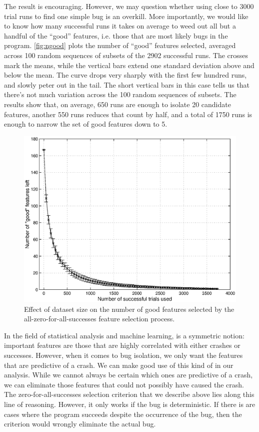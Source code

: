 The result is encouraging.  However, we may question whether using
close to 3000 trial runs to find one simple bug is an overkill.  More
importantly, we would like to know how many successful runs it takes
on average to weed out all but a handful of the ``good'' features,
i.e. those that are most likely bugs in the program.
\autoref{fig:ngood} plots the number of ``good'' features selected,
averaged across 100 random sequences of subsets of the 2902 successful
runs.  The crosses mark the means, while the vertical bars extend one
standard deviation above and below the mean.  The curve drops very
sharply with the first few hundred runs, and slowly peter out in the
tail.  The short vertical bars in this case tells us that there's not
much variation across the 100 random sequences of subsets.  The
results show that, on average, 650 runs are enough to isolate 20
candidate features, another 550 runs reduces that count by half, and
a total of 1750 runs is enough to narrow the set of good features down
to 5.

\begin{figure}
  \centering
  \small
  \includegraphics[width=\columnwidth]{applications/ds1000ngood_plot}
  \caption{Effect of dataset size on the number of good features
    selected by the all-zero-for-all-successes feature selection
    process.}
  \label{fig:ngood}
\end{figure}

In the field of statistical analysis and machine learning,
 is a symmetric notion: important features
are those that are highly correlated with either crashes or successes.
However, when it comes to bug isolation, we only want the features
that are predictive of a crash.  We can make good use of this kind of
 in our analysis.  While we cannot
always be certain which ones are predictive of a crash, we can
eliminate those features that could not possibly have caused the
crash.  The zero-for-all-successes selection criterion that we
describe above lies along this line of reasoning.  However, it only
works if the bug is deterministic.  If there is are cases where
the program succeeds despite the occurrence of the bug, then the
criterion would wrongly eliminate the actual bug.

